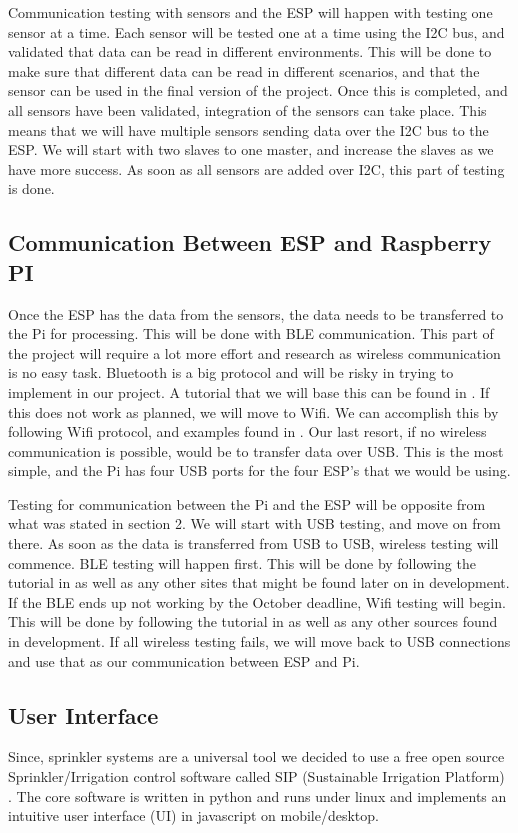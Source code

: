 \documentclass[letterpaper, 10 pt, conference]{ieeeconf}  %
\begin{document}
Communication testing with sensors and the ESP will happen with testing one sensor at a time. Each sensor will be tested one at a time using the I2C bus, and validated that data can be read in different environments. This will be done to make sure that different data can be read in different scenarios, and that the sensor can be used in the final version of the project. Once this is completed, and all sensors have been validated, integration of the sensors can take place. This means that we will have multiple sensors sending data over the I2C bus to the ESP. We will start with two slaves to one master, and increase the slaves as we have more success. As soon as all sensors are added over I2C, this part of testing is done. 

\subsection{Communication Between ESP and Raspberry PI}
Once the ESP has the data from the sensors, the data needs to be transferred to the Pi for processing. This will be done with BLE communication. This part of the project will require a lot more effort and research as wireless communication is no easy task. Bluetooth is a big protocol and will be risky in trying to implement in our project. A tutorial that we will base this can be found in \cite{micropy}. If this does not work as planned, we will move to Wifi. We can accomplish this by following Wifi protocol, and examples found in \cite{rasServer}. Our last resort, if no wireless communication is possible, would be to transfer data over USB. This is the most simple, and the Pi has four USB ports for the four ESP's that we would be using.

Testing for communication between the Pi and the ESP will be opposite from what was stated in section 2. We will start with USB testing, and move on from there. As soon as the data is transferred from USB to USB, wireless testing will commence. BLE testing will happen first. This will be done by following the tutorial in \cite{micropy} as well as any other sites that might be found later on in development. If the BLE ends up not working by the October deadline, Wifi testing will begin. This will be done by following the tutorial in \cite{rasServer} as well as any other sources found in development. If all wireless testing fails, we will move back to USB connections and use that as our communication between ESP and Pi. 

\subsection{User Interface}
Since, sprinkler systems are a universal tool we decided to use a free open source Sprinkler/Irrigation control software called SIP (Sustainable Irrigation Platform) \cite{SIP}. The core software is written in python and runs under linux and implements an intuitive user interface (UI) in javascript on mobile/desktop. 
\end{document}
